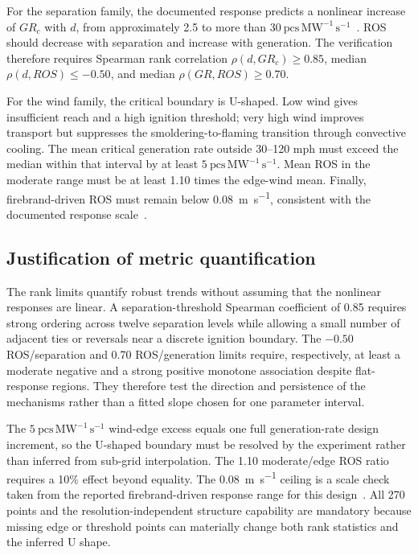 For the separation family, the documented response predicts a nonlinear
increase of \(GR_{c}\) with \(d\), from approximately 2.5 to more than
\(30\ \mathrm{pcs\,MW^{-1}\,s^{-1}}\)~\cite{Qin2025,QinEtAl2026}. ROS
should decrease with separation
and increase with generation. The verification therefore requires Spearman
rank correlation \(\rho(d,GR_{c})\ge0.85\), median
\(\rho(d,ROS)\le-0.50\), and median \(\rho(GR,ROS)\ge0.70\).

For the wind family, the critical boundary is U-shaped. Low wind gives
insufficient reach and a high ignition threshold; very high wind improves
transport but suppresses the smoldering-to-flaming transition through
convective cooling. The mean critical generation rate outside 30--120 mph
must exceed the median within that interval by at least
\(5\ \mathrm{pcs\,MW^{-1}\,s^{-1}}\). Mean ROS in the moderate range must
be at least 1.10 times the edge-wind mean. Finally, firebrand-driven ROS must
remain below \SI{0.08}{m.s^{-1}}, consistent with the documented response
scale~\cite{Qin2025,QinEtAl2026}.

\subsection{Justification of metric quantification}

The rank limits quantify robust trends without assuming that the nonlinear
responses are linear.  A separation-threshold Spearman coefficient of 0.85
requires strong ordering across twelve separation levels while allowing a
small number of adjacent ties or reversals near a discrete ignition boundary.
The \(-0.50\) ROS/separation and 0.70 ROS/generation limits require,
respectively, at least a moderate negative and a strong positive monotone
association despite flat-response regions.  They therefore test the direction
and persistence of the mechanisms rather than a fitted slope chosen for one
parameter interval.

The \(5\ \mathrm{pcs\,MW^{-1}\,s^{-1}}\) wind-edge excess equals one full
generation-rate design increment, so the U-shaped boundary must be resolved by
the experiment rather than inferred from sub-grid interpolation.  The 1.10
moderate/edge ROS ratio requires a 10\% effect beyond equality.  The
\SI{0.08}{m.s^{-1}} ceiling is a scale check taken from the reported
firebrand-driven response range for this design~\cite{Qin2025,QinEtAl2026}.
All 270 points and the resolution-independent structure capability are
mandatory because missing edge or threshold points can materially change both
rank statistics and the inferred U shape.

